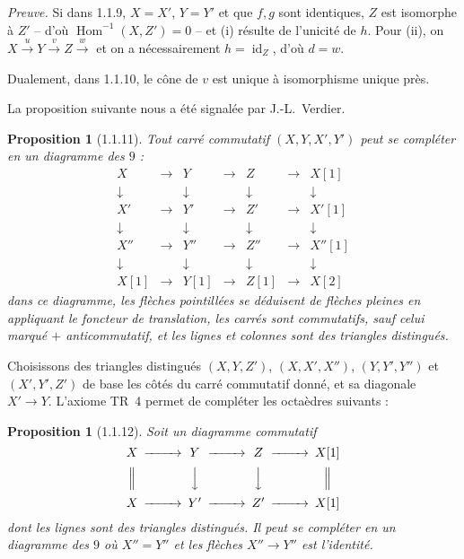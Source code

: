 \documentclass[12pt,a4paper]{article}
\theoremstyle{plain}
\newtheorem{proposition}[theorem]{Proposition}
\theoremstyle{definition}
\theoremstyle{remark}
\DeclareMathOperator{\Hom}{Hom}
\DeclareMathOperator{\id}{id}
\begin{document}
\smallskip

\emph{Preuve.} Si dans 1.1.9, $X = X'$, $Y = Y'$ et que $f, g$ sont identiques, $Z$ est isomorphe à $Z'$ -- d'où $\Hom^{-1}(X, Z') = 0$ -- et (i) résulte de l'unicité de $h$. Pour (ii), on $X \xrightarrow{u} Y \xrightarrow{v} Z \xrightarrow{w}$ et on a nécessairement $h = \id_{Z}$, d'où $d = w$.

\medskip

Dualement, dans 1.1.10, le cône de $v$ est unique à isomorphisme unique près.

La proposition suivante nous a été signalée par J.-L.~Verdier.

\begin{proposition}[1.1.11]
Tout carré commutatif $(X, Y, X', Y')$ peut se compléter en un diagramme des $9$ :
\[
\begin{array}{ccccccccc}
X & \longrightarrow & Y & \longrightarrow & Z & \longrightarrow & X[1] \\
\downarrow & & \downarrow & & \downarrow & & \downarrow \\
X' & \longrightarrow & Y' & \longrightarrow & Z' & \longrightarrow & X'[1] \\
\downarrow & & \downarrow & & \downarrow & & \downarrow \\
X'' & \longrightarrow & Y'' & \longrightarrow & Z'' & \longrightarrow & X''[1] \\
\downarrow & & \downarrow & & \downarrow & & \downarrow \\
X[1] & \longrightarrow & Y[1] & \longrightarrow & Z[1] & \longrightarrow & X[2]
\end{array}
\]
dans ce diagramme, les flèches pointillées se déduisent de flèches pleines en appliquant le foncteur de translation, les carrés sont commutatifs, sauf celui marqué $+$ anticommutatif, et les lignes et colonnes sont des triangles distingués.
\end{proposition}

Choisissons des triangles distingués $(X, Y, Z')$, $(X, X', X'')$, $(Y, Y', Y'')$ et $(X', Y', Z')$ de base les côtés du carré commutatif donné, et sa diagonale $X' \to Y$. L'axiome TR~4 permet de compléter les octaèdres suivants :

\newpage

\begin{proposition}[1.1.12]
Soit un diagramme commutatif
\[
\begin{CD}
X @>>> Y @>>> Z @>>> X[1] \\
@| @VVV @VVV @| \\
X @>>> Y' @>>> Z' @>>> X[1]
\end{CD}
\]
dont les lignes sont des triangles distingués. Il peut se compléter en un diagramme des $9$ où $X'' = Y''$ et les flèches $X'' \to Y''$ est l'identité.
\end{proposition}
\end{document}
